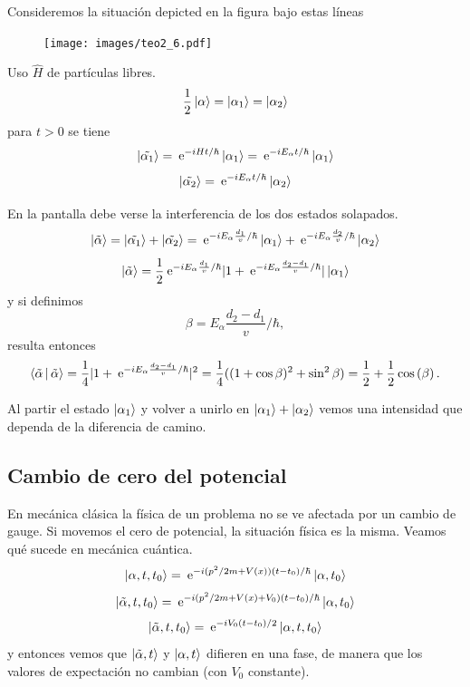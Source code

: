 \documentclass[10pt,oneside]{CBFT_book}
\begin{document}
Consideremos la situación depicted en la figura bajo estas líneas

\begin{figure}[h]
	\begin{center}
	\texttt{[image: images/teo2\_6.pdf]}	 
	\end{center}
	\caption{}
\end{figure} 

Uso $\hat{H}$ de partículas libres.
\[
	\frac{1}{2} \Ket{\alpha} = \Ket{\alpha_1} = \Ket{\alpha_2}
\]
para $t>0$ se tiene 
\[
	\Ket{\tilde{\alpha_1}} = \:\mathrm{e}^{ -i H t /\hbar } \Ket{\alpha_1} =
		\:\mathrm{e}^{ -i E_\alpha t /\hbar } \Ket{\alpha_1}	
\]
\[
	\Ket{\tilde{\alpha_2}} = \:\mathrm{e}^{ -i E_\alpha t /\hbar } \Ket{\alpha_2}	
\]

En la pantalla debe verse la interferencia de los dos estados solapados.
\[
	\Ket{\tilde{\alpha}} = \Ket{\tilde{\alpha_1}} + \Ket{\tilde{\alpha_2}} =
		\:\mathrm{e}^{ -i E_\alpha \frac{d_1}{v} /\hbar } \Ket{\alpha_1} +
		\:\mathrm{e}^{ -i E_\alpha \frac{d_2}{v} /\hbar } \Ket{\alpha_2}	
\]
\[
	\Ket{\tilde{\alpha}} = \frac{1}{2} \:\mathrm{e}^{ -i E_\alpha \frac{d_1}{v} /\hbar } 
		| 1 + \:\mathrm{e}^{ -i E_\alpha \frac{d_2-d_1}{v} /\hbar } | \Ket{\alpha_1}
\]
y si definimos
\[
	\beta=E_\alpha \frac{d_2-d_1}{v} /\hbar,
\]
resulta entonces
\[
	\Braket{\tilde{\alpha}|\tilde{\alpha}} = \frac{1}{4}| 1 +  \:\mathrm{e}^{ -i E_\alpha \frac{d_2-d_1}{v} 
/\hbar } |^2 =
		\frac{1}{4}( (1+\cos\beta)^2 + \sin^2\beta ) =
			\frac{1}{2} + \frac{1}{2}\cos\left( \beta \right).
\]


Al partir el estado $\Ket{\alpha_1} $ y volver a unirlo en $\Ket{\alpha_1} + \Ket{\alpha_2}$ vemos una 
intensidad que 
dependa de la diferencia de camino.

\subsection{Cambio de cero del potencial}

En mecánica clásica la física de un problema no se ve afectada por un cambio de gauge.
Si movemos el cero de potencial, la situación física es la misma.
Veamos qué sucede en mecánica cuántica.
\[
	\Ket{\alpha,t,t_0} = \:\mathrm{e}^{ -i (p^2/2m + V(x))(t-t_0)/\hbar} \Ket{\alpha,t_0}
\]
\[
	\Ket{\tilde{\alpha},t,t_0} = \:\mathrm{e}^{ -i (p^2/2m + V(x) + V_0)(t-t_0)/\hbar} \Ket{\alpha,t_0}
\]
\[
	\Ket{\tilde{\alpha},t,t_0} = \:\mathrm{e}^{ -i V_0(t-t_0)/2 }\Ket{\alpha,t,t_0}
\]
y entonces vemos que $\Ket{\tilde{\alpha},t}$ y $\Ket{\alpha,t}$ difieren en una fase, de manera que los 
valores de 
expectación no cambian (con $V_0$ constante).
\end{document}
